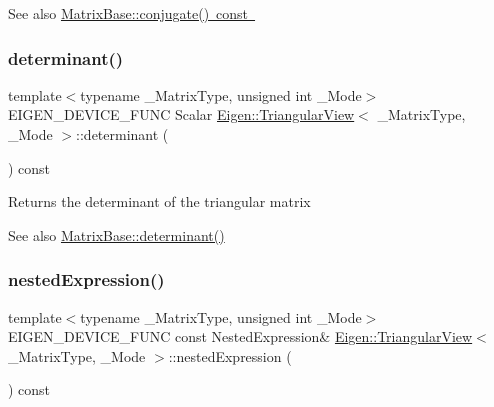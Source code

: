 \begin{DoxySeeAlso}{See also}
\mbox{\hyperlink{class_eigen_1_1_matrix_base_a28ca7fb2f2140c1429492788a65ad741}{Matrix\+Base\+::conjugate() const }} 
\end{DoxySeeAlso}
\mbox{\label{class_eigen_1_1_triangular_view_a39806fdec7a2a1a869e904c31ee8c67c}} 
\subsubsection{\texorpdfstring{determinant()}{determinant()}}
{\footnotesize\ttfamily template$<$typename \+\_\+\+Matrix\+Type, unsigned int \+\_\+\+Mode$>$ \\
E\+I\+G\+E\+N\+\_\+\+D\+E\+V\+I\+C\+E\+\_\+\+F\+U\+NC Scalar \mbox{\hyperlink{class_eigen_1_1_triangular_view}{Eigen\+::\+Triangular\+View}}$<$ \+\_\+\+Matrix\+Type, \+\_\+\+Mode $>$\+::determinant (\begin{DoxyParamCaption}{ }\end{DoxyParamCaption}) const\hspace{0.3cm}{\ttfamily [inline]}}

\begin{DoxyReturn}{Returns}
the determinant of the triangular matrix 
\end{DoxyReturn}
\begin{DoxySeeAlso}{See also}
\mbox{\hyperlink{class_eigen_1_1_matrix_base_a7ad8f77004bb956b603bb43fd2e3c061}{Matrix\+Base\+::determinant()}} 
\end{DoxySeeAlso}
\mbox{\label{class_eigen_1_1_triangular_view_a83b7cdd9d9ea543a3c893fc2e74d8fbb}} 
\subsubsection{\texorpdfstring{nestedExpression()}{nestedExpression()}\hspace{0.1cm}{\footnotesize\ttfamily [1/2]}}
{\footnotesize\ttfamily template$<$typename \+\_\+\+Matrix\+Type, unsigned int \+\_\+\+Mode$>$ \\
E\+I\+G\+E\+N\+\_\+\+D\+E\+V\+I\+C\+E\+\_\+\+F\+U\+NC const Nested\+Expression\& \mbox{\hyperlink{class_eigen_1_1_triangular_view}{Eigen\+::\+Triangular\+View}}$<$ \+\_\+\+Matrix\+Type, \+\_\+\+Mode $>$\+::nested\+Expression (\begin{DoxyParamCaption}{ }\end{DoxyParamCaption}) const\hspace{0.3cm}{\ttfamily [inline]}}

